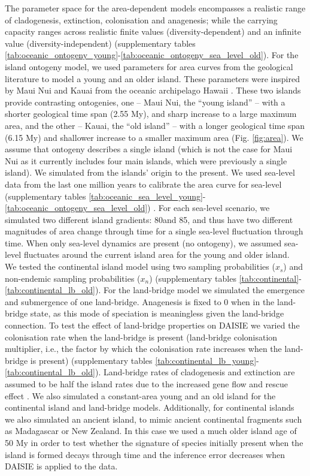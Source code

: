 \documentclass{article}
\begin{document}
The parameter space for the area-dependent models encompasses a realistic range of cladogenesis, extinction, colonisation and anagenesis; while the carrying capacity ranges across realistic finite values (diversity-dependent) and an infinite value (diversity-independent) \citep{valente_simple_2020} (supplementary tables \ref{tab:oceanic_ontogeny_young}-\ref{tab:oceanic_ontogeny_sea_level_old}). For the island ontogeny model, we used parameters for area curves from the geological literature to model a young and an older island. These parameters were inspired by Maui Nui and Kauai from the oceanic archipelago Hawaii \citep{lim_true_2017}. These two islands provide contrasting ontogenies, one -- Maui Nui, the “young island” -- with a shorter geological time span (2.55 My), and sharp increase to a large maximum area, and the other -- Kauai, the “old island” -- with a longer geological time span (6.15 My) and shallower increase to a smaller maximum area (Fig. \ref{fig:area}). We assume that ontogeny describes a single island (which is not the case for Maui Nui as it currently includes four main islands, which were previously a single island). We simulated from the islands’ origin to the present. We used sea-level data from the last one million years to calibrate the area curve for sea-level (supplementary tables \ref{tab:oceanic_sea_level_young}-\ref{tab:oceanic_ontogeny_sea_level_old}) \citep{bintanja_modelled_2005}. For each sea-level scenario, we simulated two different island gradients: 80\degree and 85\degree, and thus have two different magnitudes of area change through time for a single sea-level fluctuation through time. When only sea-level dynamics are present (no ontogeny), we assumed sea-level fluctuates around the current island area for the young and older island. \\

We tested the continental island model using two sampling probabilities ($x_s$) and non-endemic sampling probabilities ($x_n$) (supplementary tables \ref{tab:continental}-\ref{tab:continental_lb_old}). For the land-bridge model we simulated the emergence and submergence of one land-bridge. Anagenesis is fixed to 0 when in the land-bridge state, as this mode of speciation is meaningless given the land-bridge connection. To test the effect of land-bridge properties on DAISIE we varied the colonisation rate when the land-bridge is present (land-bridge colonisation multiplier, i.e., the factor by which the colonisation rate increases when the land-bridge is present) (supplementary tables \ref{tab:continental_lb_young}-\ref{tab:continental_lb_old}). Land-bridge rates of cladogenesis and extinction are assumed to be half the island rates due to the increased gene flow and rescue effect \citep{brown_turnover_1977, rosindell_unified_2011}. We also simulated a constant-area young and an old island for the continental island and land-bridge models. Additionally, for continental islands we also simulated an ancient island, to mimic ancient continental fragments such as Madagascar or New Zealand. In this case we used a much older island age of 50 My in order to test whether the signature of species initially present when the island is formed decays through time and the inference error decreases when DAISIE is applied to the data. 
\end{document}
